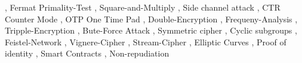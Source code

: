 \documentclass[
  10pt,
  a4paper,
]{article}
\begin{document}
\begin{multicols*}{2}
{\vspace{2mm}\color{NavyBlue!70},\vspace{2mm}} Fermat Primality-Test
{\vspace{2mm}\color{NavyBlue!70},\vspace{2mm}} Square-and-Multiply
{\vspace{2mm}\color{NavyBlue!70},\vspace{2mm}} Side channel attack
{\vspace{2mm}\color{NavyBlue!70},\vspace{2mm}} CTR Counter Mode
{\vspace{2mm}\color{NavyBlue!70},\vspace{2mm}} OTP One Time Pad
{\vspace{2mm}\color{NavyBlue!70},\vspace{2mm}} Double-Encryption
{\vspace{2mm}\color{NavyBlue!70},\vspace{2mm}} Frequeny-Analysis
{\vspace{2mm}\color{NavyBlue!70},\vspace{2mm}} Tripple-Encryption
{\vspace{2mm}\color{NavyBlue!70},\vspace{2mm}} Bute-Force Attack
{\vspace{2mm}\color{NavyBlue!70},\vspace{2mm}} Symmetric cipher
{\vspace{2mm}\color{NavyBlue!70},\vspace{2mm}} Cyclic subgroups
{\vspace{2mm}\color{NavyBlue!70},\vspace{2mm}} Feistel-Network
{\vspace{2mm}\color{NavyBlue!70},\vspace{2mm}} Vignere-Cipher
{\vspace{2mm}\color{NavyBlue!70},\vspace{2mm}} Stream-Cipher
{\vspace{2mm}\color{NavyBlue!70},\vspace{2mm}} Elliptic Curves
{\vspace{2mm}\color{NavyBlue!70},\vspace{2mm}} Proof of identity
{\vspace{2mm}\color{NavyBlue!70},\vspace{2mm}} Smart Contracts
{\vspace{2mm}\color{NavyBlue!70},\vspace{2mm}} Non-repudiation

\end{multicols*}
\end{document}

